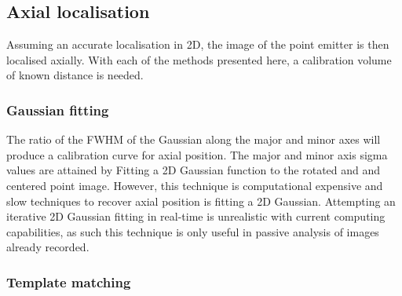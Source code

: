 \subsection{Axial localisation}

Assuming an accurate localisation in 2D, the image of the point emitter is then localised axially.
With each of the methods presented here, a calibration volume of known distance is needed.

%

\subsubsection{Gaussian fitting}

The ratio of the FWHM of the Gaussian along the major and minor axes will produce a calibration curve for axial position.
The major and minor axis sigma values are attained by Fitting a 2D Gaussian function to the rotated and and centered point image.
However, this technique is computational expensive and slow techniques to recover axial position is fitting a 2D Gaussian.
Attempting an iterative 2D Gaussian fitting in real-time is unrealistic with current computing capabilities, as such this technique is only useful in passive analysis of images already recorded.

\subsubsection{Template matching}

